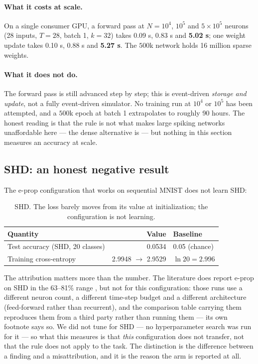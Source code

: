 \documentclass[11pt]{article}
\begin{document}
\paragraph{What it costs at scale.} On a single consumer GPU, a forward pass at
$N = 10^4$, $10^5$ and $5 \times 10^5$ neurons (28 inputs, $T = 28$, batch 1,
$k = 32$) takes 0.09 s, 0.83 s and \textbf{5.02 s}; one weight update takes
0.10 s, 0.88 s and \textbf{5.27 s}. The $500$k network holds 16 million sparse
weights.

\paragraph{What it does not do.} The forward pass is still advanced step by step;
this is event-driven \emph{storage and update}, not a fully event-driven
simulator. No training run at $10^4$ or $10^5$ has been attempted, and a $500$k
epoch at batch 1 extrapolates to roughly 90 hours. The honest reading is that the
rule is not what makes large spiking networks unaffordable here --- the dense
alternative is --- but nothing in this section measures an accuracy at scale.

\subsection{SHD: an honest negative result}
The e-prop configuration that works on sequential MNIST does not learn SHD:

\begin{table}[h]
\centering
\begin{tabular}{lrl}
\toprule
Quantity & Value & Baseline \\
\midrule
Test accuracy (SHD, 20 classes) & 0.0534 & 0.05 (chance) \\
Training cross-entropy & 2.9948 $\rightarrow$ 2.9529 & $\ln 20 = 2.996$ \\
\bottomrule
\end{tabular}
\caption{SHD. The loss barely moves from its value at initialization; the
configuration is not learning.}
\end{table}

The attribution matters more than the number. The literature does report e-prop on
SHD in the 63--81\% range \citep{pes2025tp}, but not for this configuration: those
runs use a different neuron count, a different time-step budget and a different
architecture (feed-forward rather than recurrent), and the comparison table
carrying them reproduces them from a third party rather than running them --- its
own footnote says so. We
did not tune for SHD --- no hyperparameter search was run for it --- so what
this measures is that \emph{this} configuration does not transfer, not that the
rule does not apply to the task. The distinction is the difference between a
finding and a misattribution, and it is the reason the arm is reported at all.
\end{document}
